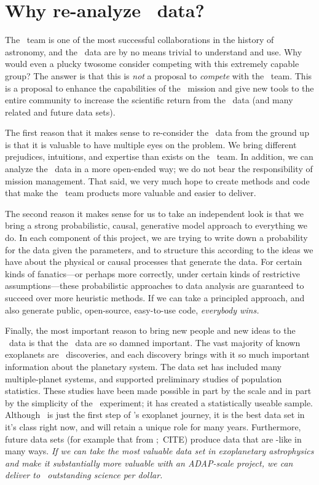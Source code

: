 \documentclass[letterpaper,12pt,preprint]{hack_aastex}
\begin{document}
\section{Why re-analyze \Kepler\ data?}

The \Kepler\ team is one of the most successful collaborations in the
history of astronomy, and the \Kepler\ data are by no means trivial to
understand and use.  Why would even a plucky twosome consider
competing with this extremely capable group?  The answer is that this
is \emph{not} a proposal to \emph{compete} with the \Kepler\ team.
This is a proposal to enhance the capabilities of the \Kepler\ mission
and give new tools to the entire community to increase the scientific
return from the \Kepler\ data (and many related and future data sets).

The first reason that it makes sense to re-consider the \Kepler\ data
from the ground up is that it is valuable to have
multiple eyes on the problem.  We bring different prejudices,
intuitions, and expertise than exists on the
\Kepler\ team.  In addition, we can analyze the \Kepler\ data in a
more open-ended way; we do not bear the responsibility of
mission management.
That said, we very much hope to create methods and code that make the
\Kepler\ team products more valuable and easier to deliver.

The second reason it makes sense for us to take an independent look
is that we bring a strong probabilistic,
causal, generative model approach to everything we do.  In each
component of this project, we are trying to write down a probability
for the data given the parameters, and to structure this
according to
the ideas we have about the physical or causal processes that
generate the data.  For certain kinds of fanatics---or
perhaps more correctly, under certain kinds of restrictive
assumptions---these probabilistic approaches to data analysis are
guaranteed to succeed over more heuristic methods.
If we can take a principled approach, and also
generate public, open-source, easy-to-use code,
\emph{everybody wins.}

Finally, the most important reason to bring new people and new ideas
to the \Kepler\ data is that the \Kepler\ data are so damned
important.  The vast majority of known exoplanets are
\Kepler\ discoveries, and each discovery brings with
it so much important information about the planetary system.
The data set has included many multiple-planet systems, and supported
preliminary studies of population statistics.  These studies have been made
possible in part by the scale and in part by the simplicity of the
\Kepler\ experiment; it has created a statistically useable sample.
Although \Kepler\ is just the first step of \NASA's exoplanet journey,
it is the best data set in it's class right now, and will retain
a unique role for many years.  Furthermore, future
data sets (for example that from \TESS;\ CITE) produce data that are
\Kepler-like in many ways.  \emph{If we can take the most valuable
  data set in exoplanetary astrophysics and make it substantially more
  valuable with an ADAP-scale project, we can deliver to
  \NASA\ outstanding science per dollar.}
\end{document}
